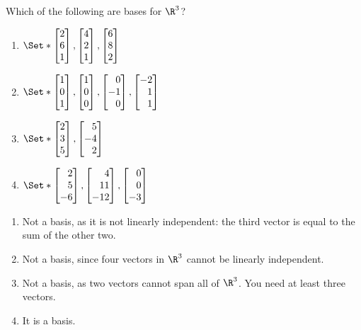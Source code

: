 \begin{exercises}
\begin{problist}
		\prob Which of the following are bases for $\R^3$?
		\begin{enumerate}
			\item $\Set*{\mat{2\\6\\1}, \mat{4\\2\\1}, \mat{6\\8\\2}}$
			\item $\Set*{\mat{1\\0\\1}, \mat{1\\0\\0}, \mat{0\\-1\\0}, \mat{-2\\1\\1}}$
			\item $\Set*{\mat{2\\3\\5}, \mat{5\\-4\\2}}$
			\item $\Set*{\mat{2\\5\\-6}, \mat{4\\11\\-12}, \mat{0\\0\\-3}}$
		\end{enumerate}
		\begin{solution}
			\begin{enumerate}
				\item Not a basis, as it is not linearly independent: the third vector is equal to the sum of the other two.

				\item Not a basis, since four vectors in $\R^3$ cannot be linearly independent.

				\item Not a basis, as two vectors cannot span all of $\R^3$. You need at least three vectors.

				\item It is a basis.
			\end{enumerate}
		\end{solution}



\end{problist}
\end{exercises}
